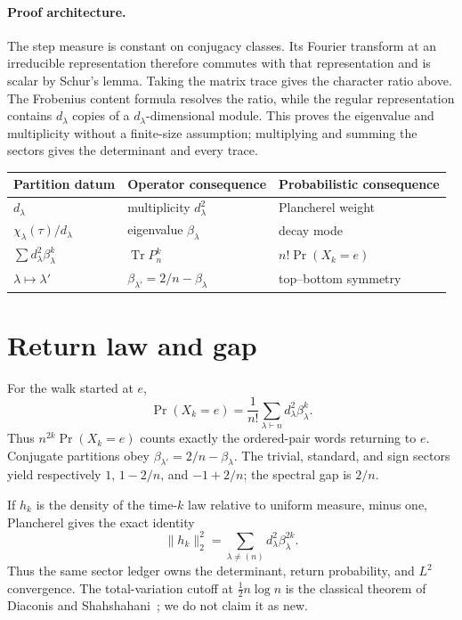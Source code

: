\documentclass[9pt]{extarticle}
\begin{document}
\paragraph{Proof architecture.}
The step measure is constant on conjugacy classes.  Its Fourier transform at
an irreducible representation therefore commutes with that representation
and is scalar by Schur's lemma.  Taking the matrix trace gives the character
ratio above.  The Frobenius content formula resolves the ratio, while the
regular representation contains $d_\lambda$ copies of a
$d_\lambda$-dimensional module.  This proves the eigenvalue and multiplicity
without a finite-size assumption; multiplying and summing the sectors gives
the determinant and every trace.

\begin{center}\small
\begin{tabular}{lll}
\toprule
Partition datum & Operator consequence & Probabilistic consequence\\
\midrule
$d_\lambda$ & multiplicity $d_\lambda^2$ & Plancherel weight\\
$\chi_\lambda(\tau)/d_\lambda$ & eigenvalue $\beta_\lambda$ & decay mode\\
$\sum d_\lambda^2\beta_\lambda^k$ & $\operatorname{Tr}P_n^k$ & $n!\Pr(X_k=e)$\\
$\lambda\mapsto\lambda'$ & $\beta_{\lambda'}=2/n-\beta_\lambda$ & top--bottom symmetry\\
\bottomrule
\end{tabular}
\end{center}

\section{Return law and gap}
For the walk started at $e$,
\[
 \Pr(X_k=e)=\frac1{n!}\sum_{\lambda\vdash n}
 d_\lambda^2\beta_\lambda^k.
\]
Thus $n^{2k}\Pr(X_k=e)$ counts exactly the ordered-pair words returning to
$e$.  Conjugate partitions obey $\beta_{\lambda'}=2/n-\beta_\lambda$.
The trivial, standard, and sign sectors yield respectively
$1$, $1-2/n$, and $-1+2/n$; the spectral gap is $2/n$.

If $h_k$ is the density of the time-$k$ law relative to uniform measure,
minus one, Plancherel gives the exact identity
\[
 \|h_k\|_2^2=\sum_{\lambda\ne(n)}
 d_\lambda^2\beta_\lambda^{2k}.
\]
Thus the same sector ledger owns the determinant, return probability, and
$L^2$ convergence.  The total-variation cutoff at
$\tfrac12 n\log n$ is the classical theorem of Diaconis and
Shahshahani~\cite{DS81}; we do not claim it as new.
\end{document}
